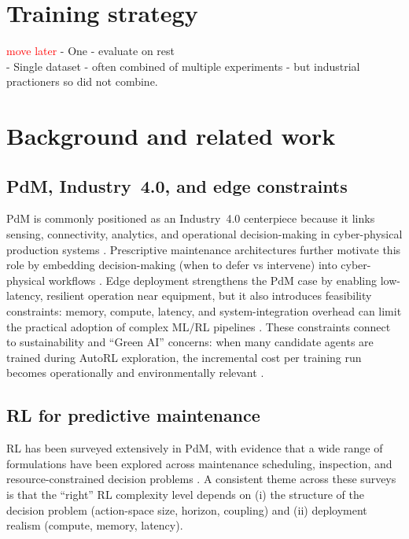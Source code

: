 \documentclass[sn-basic]{sn-jnl} %
\begin{document}
\section{Training strategy}
\huge\textcolor{red}{move later}
\normalsize
 - One - evaluate on rest\\
 - Single dataset - often combined of multiple experiments - but industrial practioners so did not combine.\\


\section{Background and related work}
\subsection{PdM, Industry~4.0, and edge constraints}
PdM is commonly positioned as an Industry~4.0 centerpiece because it links sensing, connectivity, analytics, and operational decision-making in cyber-physical production systems \cite{Compare2020, Zonta2020}. Prescriptive maintenance architectures further motivate this role by embedding decision-making (when to defer vs intervene) into cyber-physical workflows \cite{Ansari2019}. Edge deployment strengthens the PdM case by enabling low-latency, resilient operation near equipment, but it also introduces feasibility constraints: memory, compute, latency, and system-integration overhead can limit the practical adoption of complex ML/RL pipelines \cite{Njor2024, Pandey2023}. These constraints connect to sustainability and ``Green AI'' concerns: when many candidate agents are trained during AutoRL exploration, the incremental cost per training run becomes operationally and environmentally relevant \cite{Schwartz2020, Strubell2019}.

\subsection{RL for predictive maintenance}
RL has been surveyed extensively in PdM, with evidence that a wide range of formulations have been explored across maintenance scheduling, inspection, and resource-constrained decision problems \cite{Siraskar2023, Ogunfowora2023, Zhang2024}. A consistent theme across these surveys is that the ``right'' RL complexity level depends on (i) the structure of the decision problem (action-space size, horizon, coupling) and (ii) deployment realism (compute, memory, latency).
\end{document}
